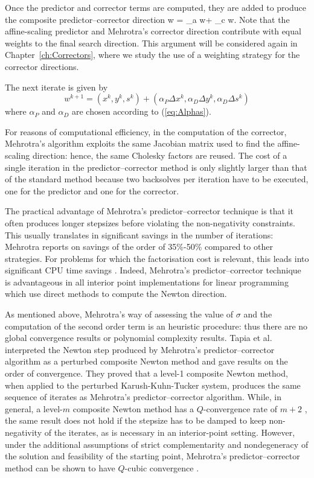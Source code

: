 Once the predictor and corrector terms are computed, they are 
added to produce the composite predictor--corrector direction
\be \label{eq:CompositeDirection}
\Delta w = \Delta_a w+ \Delta_c w.
\ee
Note that the affine-scaling predictor and Mehrotra's corrector direction 
contribute with equal weights to the final search direction. 
This argument will be considered again in Chapter~\ref{ch:Correctors}, 
where we study the use of a weighting strategy for the corrector
directions.

The next iterate is given by
\[
w^{k+1} = (x^k,y^k,s^k)
        + (\alpha_P\Delta x^k,\alpha_D\Delta y^k,\alpha_D\Delta s^k)
\]
where $\alpha_P$ and $\alpha_D$ are chosen according to (\ref{eq:Alphas}).

For reasons of computational efficiency, in the computation of
the corrector, Mehrotra's algorithm exploits 
the same Jacobian matrix used to find the affine-scaling direction: 
hence, the same Cholesky factors are reused.
The cost of a single iteration in the predictor--corrector 
method is only slightly larger than that of the standard 
method because two backsolves per iteration have to be executed, 
one for the predictor and one for the corrector. 

The practical advantage of Mehrotra's predictor--corrector technique
is that it often produces longer stepsizes before violating the 
non-negativity constraints.
%
This usually translates in significant savings in the number of 
iterations: Mehrotra \cite{Mehrotra92} reports on savings of the
order of 35\%-50\% compared to other strategies.
For problems for which the factorisation cost is relevant, this
leads into significant 
CPU time savings \cite{LustigMarstenShanno,Mehrotra92}. Indeed, 
Mehrotra's predictor--corrector technique is advantageous in all 
interior point implementations for linear programming 
which use direct methods to compute 
the Newton direction.


As mentioned above, Mehrotra's way of assessing the value of $\sigma$
and the computation of the second order term is an heuristic procedure: 
thus there are 
no global convergence results or polynomial complexity results. 
Tapia et al. \cite{TapiaZhangSaltzmanWeiser} interpreted the Newton step 
produced by Mehrotra's predictor--corrector algorithm as a perturbed
composite Newton method and gave results on the order of convergence. 
They proved that a level-1 composite Newton method, when applied 
to the perturbed Karush-Kuhn-Tucker system, produces the same 
sequence of iterates as Mehrotra's predictor--corrector algorithm. 
While, in general, a level-$m$ composite Newton method has 
a $Q$-convergence rate of $m+2$ \cite{OrtegaRheinboldt},
the same result does not hold 
if the stepsize has to be damped to keep non-negativity of the iterates, 
as is necessary in an interior-point setting. However, under 
the additional assumptions of strict complementarity and nondegeneracy 
of the solution and feasibility of the starting point, Mehrotra's 
predictor--corrector method can be shown to have $Q$-cubic convergence
\cite{TapiaZhangSaltzmanWeiser}.


